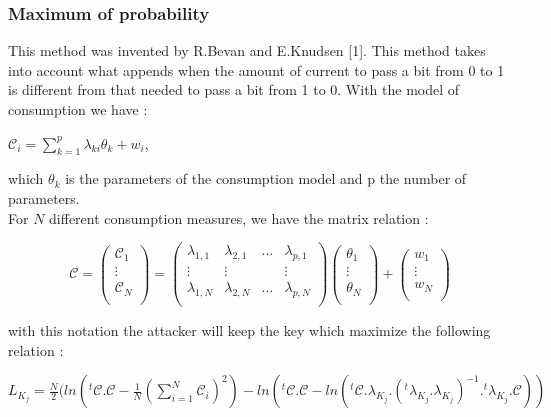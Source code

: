 \subsubsection{Maximum of probability}
This method was invented by R.Bevan and E.Knudsen [1]. This method takes into account
 what appends when the amount of current to pass a bit from 0 to 1 is different from that needed to pass a
  bit from 1 to 0. 
With the model of consumption we have :
\begin{center}
$\mathcal{C}_{i}=\sum_{k=1}^{p}\lambda_{ki} \theta_{k} + w_{i}$,
\end{center}
which $\theta_{k}$ is the parameters of the consumption model and p the number of parameters.\\
For $N$ different consumption measures, we have the matrix relation :
\begin{center}
\begin{displaymath}
\mathcal{C}=
\left(\begin{array}{ccc}
\mathcal{C}_{1} \\
\vdots \\
\mathcal{C}_{N} \\
\end{array}\right)
=
\left( \begin{array}{cccc}
\lambda_{1,1} & \lambda_{2,1} & \ldots & \lambda_{p,1} \\
\vdots        & \vdots        &        & \vdots \\
\lambda_{1,N} & \lambda_{2,N} & \ldots & \lambda_{p,N}\\
\end{array} \right) 
\left( \begin{array}{ccc}
\theta_{1} \\
\vdots \\
\theta_{N} \\
\end{array} \right)
+
\left( \begin{array}{ccc}
w_{1} \\
\vdots \\
w_{N} \\
\end{array} \right)
\end{displaymath}
\end{center}

with this notation the attacker will keep the key which maximize the following relation :
\begin{center}
$L_{K_{j}}=\frac{N}{2} ( ln({}^t \! \mathcal{C} . \mathcal{C} - \frac{1}{N}(\sum_{i=1}^{N}\mathcal{C}_{i})^2)
- ln({}^t \! \mathcal{C} . \mathcal{C} -ln({}^t \! \mathcal{C} . \lambda_{K_{j}}.( {}^t \! \lambda_{K_{j}}.
\lambda_{K_{j}})^{-1} . {}^t \! \lambda_{K_{j}}.\mathcal{C}))$
\end{center}

